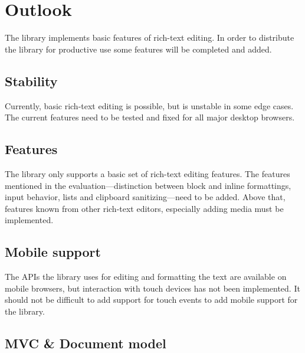 

\chapter{Outlook}

The library implements basic features of rich-text editing. In order to distribute the library for productive use some features will be completed and added.

\section{Stability}

Currently, basic rich-text editing is possible, but is unstable in some edge cases. The current features need to be tested and fixed for all major desktop browsers.

\section{Features}

The library only supports a basic set of rich-text editing features. The features mentioned in the evaluation---distinction between block and inline formattings, input behavior, lists and clipboard sanitizing---need to be added. Above that, features known from other rich-text editors, especially adding media must be implemented.


\section{Mobile support}

The APIs the library uses for editing and formatting the text are available on mobile browsers, but interaction with touch devices has not been implemented. It should not be difficult to add support for touch events to add mobile support for the library.


\section{MVC \& Document model}

